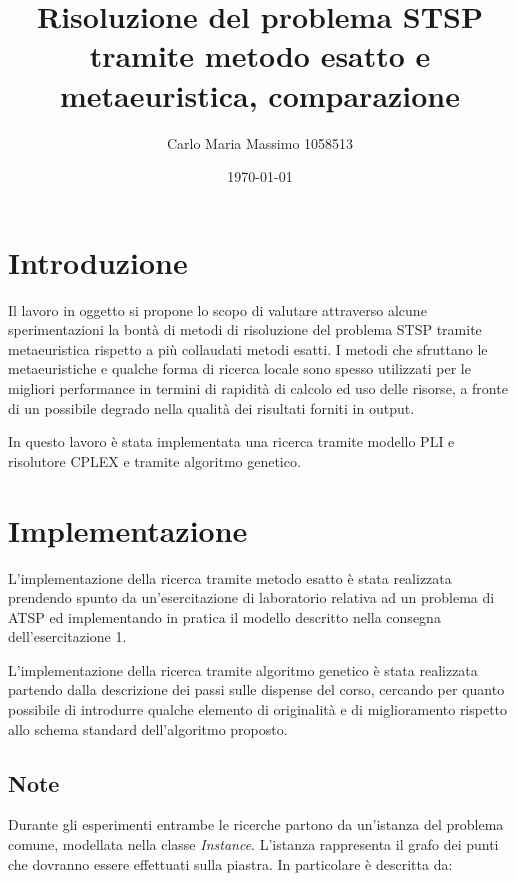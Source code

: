 \documentclass[a4paper]{article}
\begin{document}
\title{Risoluzione del problema STSP tramite metodo esatto e metaeuristica, comparazione}
\author{Carlo Maria Massimo 1058513}
\date{\today}
\maketitle

\tableofcontents

    \section{Introduzione}
        Il lavoro in oggetto si propone lo scopo di valutare attraverso alcune sperimentazioni la bont\`a di metodi
        di risoluzione del problema STSP tramite metaeuristica rispetto a pi\`u collaudati metodi esatti.
        I metodi che sfruttano le metaeuristiche e qualche forma di ricerca locale sono spesso utilizzati per le migliori
        performance in termini di rapidit\`a di calcolo ed uso delle risorse, a fronte di un possibile degrado nella qualit\`a
        dei risultati forniti in output.

        In questo lavoro \`e stata implementata una ricerca tramite modello PLI e risolutore CPLEX e tramite algoritmo genetico.

    \section{Implementazione}
        L'implementazione della ricerca tramite metodo esatto \`e stata realizzata prendendo spunto da un'esercitazione di laboratorio
        relativa ad un problema di ATSP ed implementando in pratica il modello descritto nella consegna dell'esercitazione 1.

        L'implementazione della ricerca tramite algoritmo genetico \`e stata realizzata partendo dalla descrizione dei passi
        sulle dispense del corso, cercando per quanto possibile di introdurre qualche elemento di originalit\`a e di miglioramento rispetto
        allo schema standard dell'algoritmo proposto.

        \subsection{Note}
        Durante gli esperimenti entrambe le ricerche partono da un'istanza del problema comune, modellata nella classe \emph{Instance}.
        L'istanza rappresenta il grafo dei punti che dovranno essere effettuati sulla piastra.
        In particolare \`e descritta da:
\end{document}
